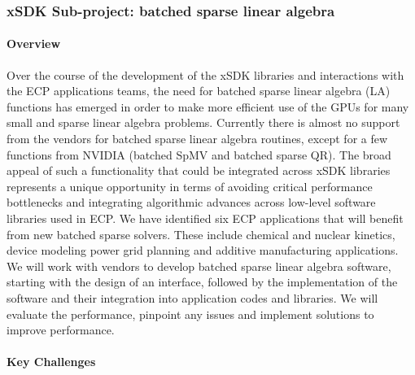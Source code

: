 \subsubsection{ xSDK Sub-project: batched sparse linear algebra}

\paragraph{Overview}

Over the course of the development of the xSDK libraries and
interactions with the ECP applications teams, the need for batched
sparse linear algebra (LA) functions has emerged in order to make more
efficient use of the GPUs for many small and sparse linear algebra
problems. Currently there is almost no support from the vendors for
batched sparse linear algebra routines, except
for a few functions from NVIDIA (batched SpMV and batched sparse QR).
The broad appeal of such a functionality that could be
integrated across xSDK libraries represents a unique opportunity in
terms of avoiding critical performance bottlenecks and integrating
algorithmic advances across low-level software libraries used in ECP.
We have identified six ECP applications that will benefit from new batched sparse solvers.
These include chemical and nuclear kinetics, device modeling  power grid planning and additive manufacturing applications.
We will work with vendors to develop batched sparse linear algebra software, starting with the design of an interface,
followed by the implementation of the software and their integration into application codes and libraries.
We will evaluate the performance, pinpoint any issues and implement solutions to improve performance.


\paragraph{Key Challenges}

